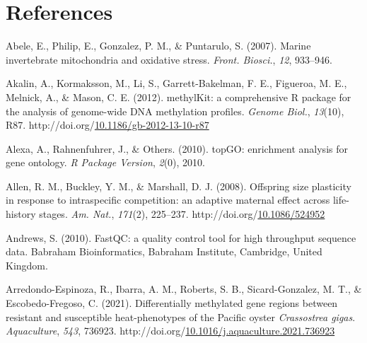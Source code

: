 \documentclass [11pt, proquest] {uwthesis}[2015/03/03]
\newlength{\cslhangindent}
\newenvironment{CSLReferences}%
{\setlength{\parindent}{0pt}%
\everypar{\setlength{\hangindent}{\cslhangindent}}\ignorespaces}%
{\par}
\begin{document}
\hypertarget{references}{%
\chapter*{References}\label{references}}


\noindent

\setlength{\parindent}{-0.20in}
\setlength{\leftskip}{0.20in}
\setlength{\parskip}{8pt}

\hypertarget{refs}{}
\begin{CSLReferences}{1}{0}
\leavevmode\hypertarget{ref-Abele2007}{}%
Abele, E., Philip, E., Gonzalez, P. M., \& Puntarulo, S. (2007). {Marine invertebrate mitochondria and oxidative stress}. \emph{Front. Biosci.}, \emph{12}, 933--946.

\leavevmode\hypertarget{ref-Akalin2012}{}%
Akalin, A., Kormaksson, M., Li, S., Garrett-Bakelman, F. E., Figueroa, M. E., Melnick, A., \& Mason, C. E. (2012). {methylKit: a comprehensive R package for the analysis of genome-wide DNA methylation profiles}. \emph{Genome Biol.}, \emph{13}(10), R87. http://doi.org/\href{https://doi.org/10.1186/gb-2012-13-10-r87}{10.1186/gb-2012-13-10-r87}

\leavevmode\hypertarget{ref-Alexa2010}{}%
Alexa, A., Rahnenfuhrer, J., \& Others. (2010). {topGO: enrichment analysis for gene ontology}. \emph{R Package Version}, \emph{2}(0), 2010.

\leavevmode\hypertarget{ref-Allen2008}{}%
Allen, R. M., Buckley, Y. M., \& Marshall, D. J. (2008). {Offspring size plasticity in response to intraspecific competition: an adaptive maternal effect across life-history stages}. \emph{Am. Nat.}, \emph{171}(2), 225--237. http://doi.org/\href{https://doi.org/10.1086/524952}{10.1086/524952}

\leavevmode\hypertarget{ref-Andrews2010}{}%
Andrews, S. (2010). {FastQC: a quality control tool for high throughput sequence data}. Babraham Bioinformatics, Babraham Institute, Cambridge, United Kingdom.

\leavevmode\hypertarget{ref-Arredondo-Espinoza2021}{}%
Arredondo-Espinoza, R., Ibarra, A. M., Roberts, S. B., Sicard-Gonzalez, M. T., \& Escobedo-Fregoso, C. (2021). {Differentially methylated gene regions between resistant and susceptible heat-phenotypes of the Pacific oyster \emph{Crassostrea gigas}}. \emph{Aquaculture}, \emph{543}, 736923. http://doi.org/\href{https://doi.org/10.1016/j.aquaculture.2021.736923}{10.1016/j.aquaculture.2021.736923}


\end{CSLReferences}
\end{document}
